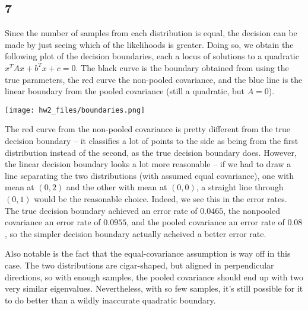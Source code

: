 \documentclass{article}
\begin{document}
\subsection*{7}
Since the number of samples from each distribution is equal, the decision can be made by just seeing which of the likelihoods is greater. Doing so, we obtain the following plot of the decision boundaries, each a locus of solutions to a quadratic $x^TAx+b^Tx+c=0$. The black curve is the boundary obtained from using the true parameters, the red curve the non-pooled covariance, and the blue line is the linear boundary from the pooled covariance (still a quadratic, but $A=0$). 

\texttt{[image: hw2\_files/boundaries.png]}

The red curve from the non-pooled covariance is pretty different from the true decision boundary -- it classifies a lot of points to the side as being from the first distribution instead of the second, as the true decision boundary does. However, the linear decision boundary looks a lot more reasonable -- if we had to draw a line separating the two distributions (with assumed equal covariance), one with mean at $(0,2)$ and the other with mean at $(0,0)$, a straight line through $(0,1)$ would be the reasonable choice. Indeed, we see this in the error rates. The true decision boundary achieved an error rate of $0.0465$, the nonpooled covariance an error rate of $0.0955$, and the pooled covariance an error rate of $0.08$, so the simpler decision boundary actually acheived a better error rate.

Also notable is the fact that the equal-covariance assumption is way off in this case. The two distributions are cigar-shaped, but aligned in perpendicular directions, so with enough samples, the pooled covariance should end up with two very similar eigenvalues. Nevertheless, with so few samples, it's still possible for it to do better than a wildly inaccurate quadratic boundary.
\end{document}
